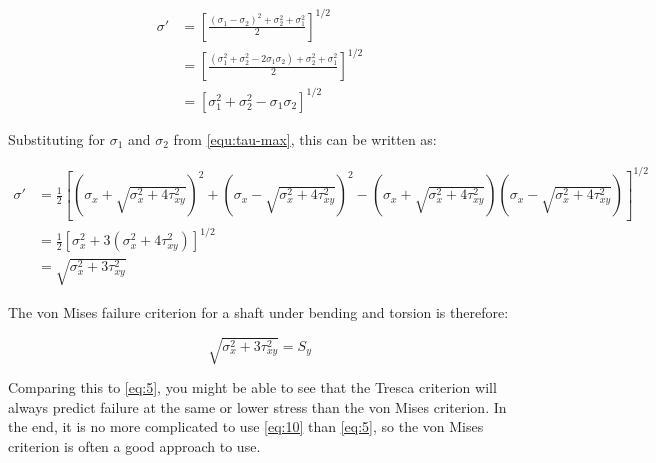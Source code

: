 \begin{align}
\label{eq:9}
  \sigma' &= \left[ \frac{ 
  \left( \sigma_1 - \sigma_2 \right)^2 + \sigma_2^2 + \sigma_1^2
  }{2} \right]^{1/2} \\
&= \left[ \frac{\left( \sigma_1^2 + \sigma_2^2 - 2 \sigma_1\sigma_2 \right) + \sigma_2^2 + \sigma_1^2}{2} \right]^{1/2} \\
          &= \left[ \sigma_1^2 + \sigma_2^2 - \sigma_1\sigma_2 \right]^{1/2} 
\end{align}

Substituting for $\sigma_1$ and $\sigma_2$ from \cref{equ:tau-max}, this can be written
as:

\begin{align}
\sigma' &= \frac{1}{2} \left[
          \left( \sigma_x + \sqrt{\sigma_x^2+4\tau_{xy}^2} \right)^2 +
          \left( \sigma_x - \sqrt{\sigma_x^2+4\tau_{xy}^2} \right)^2 -
          \left( \sigma_x + \sqrt{\sigma_x^2+4\tau_{xy}^2} \right)
          \left( \sigma_x - \sqrt{\sigma_x^2+4\tau_{xy}^2} \right)
          \right]^{1/2} \\
&= \frac{1}{2} \left[\sigma_x^2 + 3\left( \sigma_x^2+4\tau_{xy}^2 \right) \right]^{1/2} \\
  &= \sqrt{\sigma_x^2 + 3\tau_{xy}^2}
  \label{eq:8}
\end{align}

The von Mises failure criterion for a shaft under bending and torsion is
therefore:

\begin{equation}
\sqrt{\sigma_x^2 + 3\tau_{xy}^2} = S_y
\label{eq:10}
\end{equation}

Comparing this to \cref{eq:5}, you might be able to see that the Tresca
criterion will always predict failure at the same or lower stress than the von
Mises criterion. In the end, it is no more complicated to use \cref{eq:10} than
\cref{eq:5}, so the von Mises criterion is often a good approach to use.